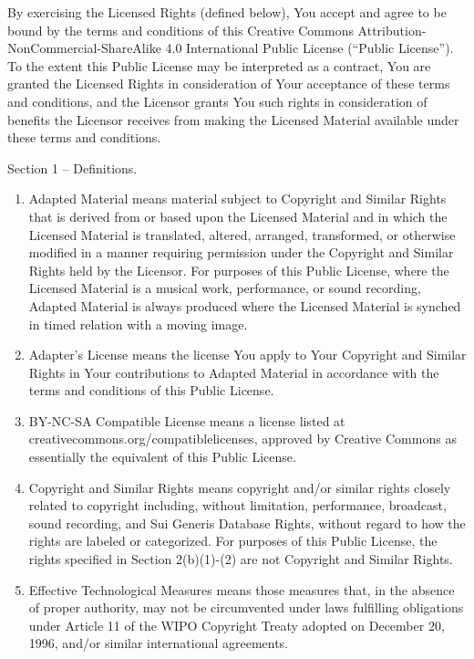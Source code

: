 \documentclass[
]{scrbook}
\begin{document}
By exercising the Licensed Rights (defined below), You accept and agree
to be bound by the terms and conditions of this Creative Commons
Attribution-NonCommercial-ShareAlike 4.0 International Public License
(``Public License''). To the extent this Public License may be
interpreted as a contract, You are granted the Licensed Rights in
consideration of Your acceptance of these terms and conditions, and the
Licensor grants You such rights in consideration of benefits the
Licensor receives from making the Licensed Material available under
these terms and conditions.

Section 1 -- Definitions.

\begin{enumerate}
\def\labelenumi{\alph{enumi}.}
\item
  Adapted Material means material subject to Copyright and Similar
  Rights that is derived from or based upon the Licensed Material and in
  which the Licensed Material is translated, altered, arranged,
  transformed, or otherwise modified in a manner requiring permission
  under the Copyright and Similar Rights held by the Licensor. For
  purposes of this Public License, where the Licensed Material is a
  musical work, performance, or sound recording, Adapted Material is
  always produced where the Licensed Material is synched in timed
  relation with a moving image.
\item
  Adapter's License means the license You apply to Your Copyright and
  Similar Rights in Your contributions to Adapted Material in accordance
  with the terms and conditions of this Public License.
\item
  BY-NC-SA Compatible License means a license listed at
  creativecommons.org/compatiblelicenses, approved by Creative Commons
  as essentially the equivalent of this Public License.
\item
  Copyright and Similar Rights means copyright and/or similar rights
  closely related to copyright including, without limitation,
  performance, broadcast, sound recording, and Sui Generis Database
  Rights, without regard to how the rights are labeled or categorized.
  For purposes of this Public License, the rights specified in Section
  2(b)(1)-(2) are not Copyright and Similar Rights.
\item
  Effective Technological Measures means those measures that, in the
  absence of proper authority, may not be circumvented under laws
  fulfilling obligations under Article 11 of the WIPO Copyright Treaty
  adopted on December 20, 1996, and/or similar international agreements.

\end{enumerate}
\end{document}
